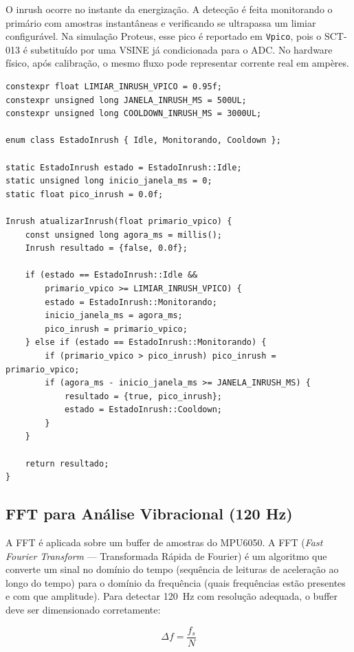 \documentclass[12pt, a4paper]{article}
\begin{document}
O inrush ocorre no instante da energização. A detecção é feita monitorando o primário com amostras instantâneas e verificando se ultrapassa um limiar configurável. Na simulação Proteus, esse pico é reportado em \texttt{Vpico}, pois o SCT-013 é substituído por uma VSINE já condicionada para o ADC. No hardware físico, após calibração, o mesmo fluxo pode representar corrente real em ampères.

\begin{lstlisting}[style=cpp, caption={Detecção de Inrush Current}]
constexpr float LIMIAR_INRUSH_VPICO = 0.95f;
constexpr unsigned long JANELA_INRUSH_MS = 500UL;
constexpr unsigned long COOLDOWN_INRUSH_MS = 3000UL;

enum class EstadoInrush { Idle, Monitorando, Cooldown };

static EstadoInrush estado = EstadoInrush::Idle;
static unsigned long inicio_janela_ms = 0;
static float pico_inrush = 0.0f;

Inrush atualizarInrush(float primario_vpico) {
    const unsigned long agora_ms = millis();
    Inrush resultado = {false, 0.0f};

    if (estado == EstadoInrush::Idle &&
        primario_vpico >= LIMIAR_INRUSH_VPICO) {
        estado = EstadoInrush::Monitorando;
        inicio_janela_ms = agora_ms;
        pico_inrush = primario_vpico;
    } else if (estado == EstadoInrush::Monitorando) {
        if (primario_vpico > pico_inrush) pico_inrush = primario_vpico;
        if (agora_ms - inicio_janela_ms >= JANELA_INRUSH_MS) {
            resultado = {true, pico_inrush};
            estado = EstadoInrush::Cooldown;
        }
    }

    return resultado;
}
\end{lstlisting}

\subsection{FFT para Análise Vibracional (120 Hz)}

A FFT é aplicada sobre um buffer de amostras do MPU6050. A FFT (\textit{Fast Fourier Transform} --- Transformada Rápida de Fourier) é um algoritmo que converte um sinal no domínio do tempo (sequência de leituras de aceleração ao longo do tempo) para o domínio da frequência (quais frequências estão presentes e com que amplitude). Para detectar 120~Hz com resolução adequada, o buffer deve ser dimensionado corretamente:

\begin{equation}
    \Delta f = \frac{f_s}{N}
    \label{eq:resolucao_fft}
\end{equation}
\end{document}
